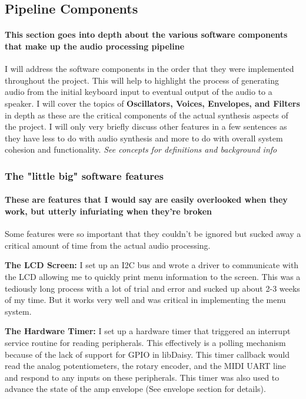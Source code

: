 \documentclass[acmlarge,screen]{acmart}
\begin{document}
\subsection{Pipeline Components}
	\paragraph{This section goes into depth about the various software components that make up the audio processing pipeline} I will address the software components in the order that they were implemented throughout the project. This will help to highlight the process of generating audio from the initial keyboard input to eventual output of the audio to a speaker. I will cover the topics of \textbf{Oscillators, Voices, Envelopes, and Filters} in depth as these are the critical components of the actual synthesis aspects of the project. I will only very briefly discuss other features in a few sentences as they have less to do with audio synthesis and more to do with overall system cohesion and functionality. \textit{See concepts for definitions and background info}
	
	\subsubsection{The "little big" software features}
	\paragraph{These are features that I would say are easily overlooked when they work, but utterly infuriating when they're broken} Some features were so important that they couldn't be ignored but sucked away a critical amount of time from the actual audio processing.

	\textbf{The LCD Screen:} I set up an I2C bus and wrote a driver to communicate with the LCD allowing me to quickly print menu information to the screen. This was a tediously long process with a lot of trial and error and sucked up about 2-3 weeks of my time. But it works very well and was critical in implementing the menu system.

	\textbf{The Hardware Timer:} I set up a hardware timer that triggered an interrupt service routine for reading peripherals. This effectively is a polling mechanism because of the lack of support for GPIO  in libDaisy. This timer callback would read the analog potentiometers, the rotary encoder, and the MIDI UART line and respond to any inputs on these peripherals. This timer was also used to advance the state of the amp envelope (See envelope section for details).
	
\end{document}
